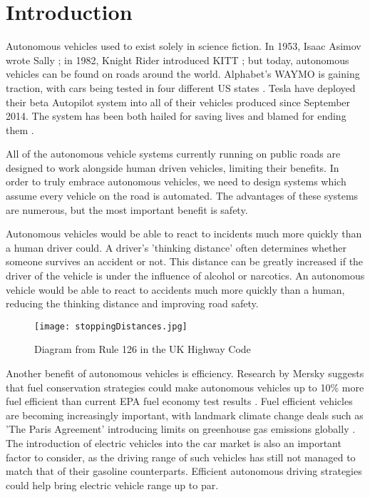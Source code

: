 \chapter{Introduction}
\label{cha:Introduction}

Autonomous vehicles used to exist solely in science fiction. In 1953, Isaac Asimov wrote Sally \citep{Asimov1953}; in 1982, Knight Rider introduced KITT \citep{Kitt1982}; but today, autonomous vehicles can be found on roads around the world. Alphabet's WAYMO is gaining traction, with cars being tested in four different US states \citep{Waymo2016}. Tesla have deployed their beta Autopilot system into all of their vehicles produced since September 2014. The system has been both hailed for saving lives and blamed for ending them \citep{TeslaHospital} \citep{TeslaUnderInvestigation}.

All of the autonomous vehicle systems currently running on public roads are designed to work alongside human driven vehicles, limiting their benefits. In order to truly embrace autonomous vehicles, we need to design systems which assume every vehicle on the road is automated. The advantages of these systems are numerous, but the most important benefit is safety.

Autonomous vehicles would be able to react to incidents much more quickly than a human driver could. A driver's 'thinking distance' often determines whether someone survives an accident or not. This distance can be greatly increased if the driver of the vehicle is under the influence of alcohol or narcotics. An autonomous vehicle would be able to react to accidents much more quickly than a human, reducing the thinking distance and improving road safety.

\begin{figure}[htb]
\texttt{[image: stoppingDistances.jpg]}
\caption{Diagram from Rule 126 in the UK Highway Code \citep{StoppingDistances}}
\end{figure}

Another benefit of autonomous vehicles is efficiency. Research by Mersky suggests that fuel conservation strategies could make autonomous vehicles up to 10\% more fuel efficient than current EPA fuel economy test results \citep{Mersky2016}. Fuel efficient vehicles are becoming increasingly important, with landmark climate change deals such as 'The Paris Agreement' introducing limits on greenhouse gas emissions globally \citep{Paris2016}. The introduction of electric vehicles into the car market is also an important factor to consider, as the driving range of such vehicles has still not managed to match that of their gasoline counterparts. Efficient autonomous driving strategies could help bring electric vehicle range up to par.

